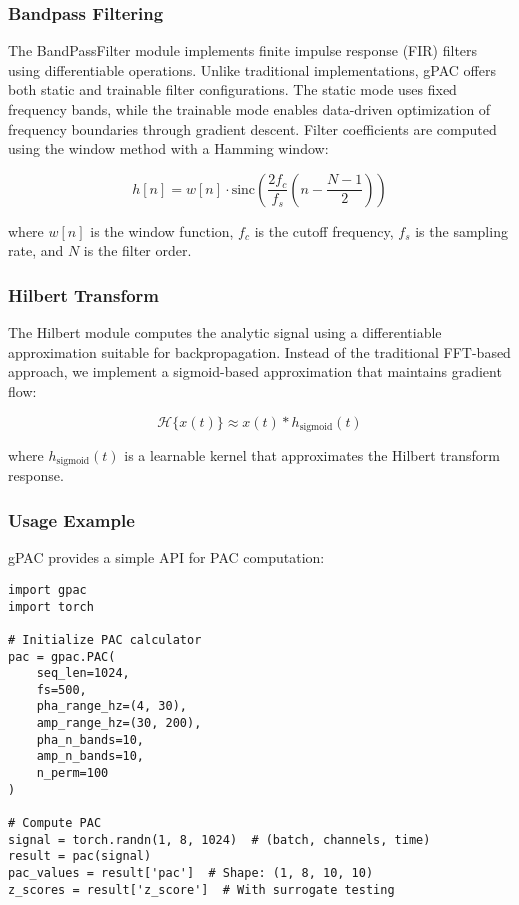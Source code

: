 \subsubsection{Bandpass Filtering}
The BandPassFilter module implements finite impulse response (FIR) filters using differentiable operations. Unlike traditional implementations, gPAC offers both static and trainable filter configurations. The static mode uses fixed frequency bands, while the trainable mode enables data-driven optimization of frequency boundaries through gradient descent. Filter coefficients are computed using the window method with a Hamming window:

\begin{equation}
h[n] = w[n] \cdot \text{sinc}\left(\frac{2f_c}{f_s}(n - \frac{N-1}{2})\right)
\end{equation}

where $w[n]$ is the window function, $f_c$ is the cutoff frequency, $f_s$ is the sampling rate, and $N$ is the filter order.

\subsubsection{Hilbert Transform}
The Hilbert module computes the analytic signal using a differentiable approximation suitable for backpropagation. Instead of the traditional FFT-based approach, we implement a sigmoid-based approximation that maintains gradient flow:

\begin{equation}
\mathcal{H}\{x(t)\} \approx x(t) \ast h_{\text{sigmoid}}(t)
\end{equation}

where $h_{\text{sigmoid}}(t)$ is a learnable kernel that approximates the Hilbert transform response.

\subsubsection{Usage Example}
gPAC provides a simple API for PAC computation:
\begin{verbatim}
import gpac
import torch

# Initialize PAC calculator
pac = gpac.PAC(
    seq_len=1024,
    fs=500,
    pha_range_hz=(4, 30),
    amp_range_hz=(30, 200),
    pha_n_bands=10,
    amp_n_bands=10,
    n_perm=100
)

# Compute PAC
signal = torch.randn(1, 8, 1024)  # (batch, channels, time)
result = pac(signal)
pac_values = result['pac']  # Shape: (1, 8, 10, 10)
z_scores = result['z_score']  # With surrogate testing
\end{verbatim}

